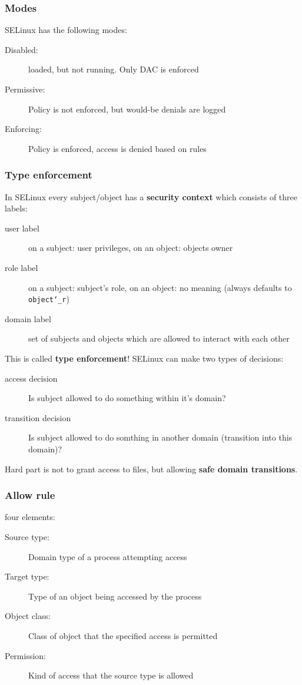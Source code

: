 \subsubsection{Modes}
SELinux has the following modes:

\begin{description}
  \item[Disabled:] loaded, but not running. Only DAC is enforced
  \item[Permissive:]  Policy is not enforced, but would-be denials are logged
  \item[Enforcing:] Policy is enforced, access is denied based on rules
\end{description}
\subsubsection{Type enforcement}

In SELinux every subject/object has a \textbf{security context} which consists of three labels:\vspace{-1.5mm}
\begin{description}
    \item[user label] on a subject: user privileges, on an object: objects owner
    \item[role label]  on a subject: subject's role, on an object: no meaning (always defaults to \texttt{object\char`_r})
    \item[domain label] set of subjects and objects which are allowed to interact with each other
\end{description}
This is called \textbf{type enforcement}! SELinux can make two types of decisions:\vspace{-1.5mm}
\begin{description}
    \item[access decision] Is subject allowed to do something within it's domain?
    \item[transition decision] Is subject allowed to do somthing in another domain (transition into this domain)?
\end{description}
Hard part is not to grant access to files, but allowing \textbf{safe domain transitions}.

\subsubsection{Allow rule}
four elements:
\begin{description}
  \item[Source type:] Domain type of a process attempting access
  \item[Target type:] Type of an object being accessed by the process
  \item[Object class:] Class of object that the specified access is permitted
  \item[Permission:] Kind of access that the source type is allowed
\end{description}

